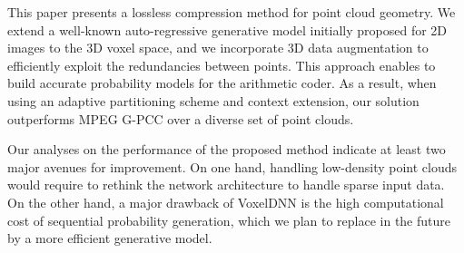 

\par This paper presents a lossless compression method for point cloud geometry. We extend a well-known auto-regressive generative model initially proposed for 2D images to the 3D voxel space, and we incorporate  3D data augmentation to efficiently exploit the redundancies between points. This approach enables to build accurate probability models for the arithmetic coder. As a result, when using an adaptive partitioning scheme and context extension, our solution outperforms MPEG G-PCC over a diverse set of point clouds. 

Our analyses on the performance of the proposed method indicate at least two major avenues for improvement. On one hand, handling low-density point clouds would require to rethink the network architecture to handle sparse input data. On the other hand, a major drawback of VoxelDNN is the high computational cost of sequential probability generation, which we plan to replace in the future by a more efficient generative model.